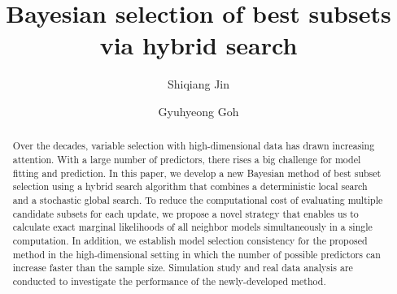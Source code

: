\documentclass[twocolumn]{svjour3}       %
\newcommand{\0}{\boldsymbol 0} %
\newcommand{\1}{\boldsymbol 1} %
\begin{document}
\title{Bayesian selection of best subsets via hybrid search%
}


\author{Shiqiang Jin         \and
        Gyuhyeong Goh %
}





\maketitle

\begin{abstract}
Over the decades, variable selection with high-dimensional data has drawn increasing attention. With a large number of predictors, there rises a big challenge for model fitting and prediction. In this paper, we develop a new Bayesian method of best subset selection using a hybrid search algorithm that combines a deterministic local search and a stochastic global search. To reduce the computational cost of evaluating multiple candidate subsets for each update, we propose a novel strategy that enables us to calculate exact marginal likelihoods of all neighbor models simultaneously in a single computation. In addition, we establish model selection consistency for the proposed method in the high-dimensional setting in which the number of possible predictors can increase faster than the sample size. Simulation study and real data analysis are conducted to investigate the performance of the newly-developed method.
\end{abstract}
\end{document}
